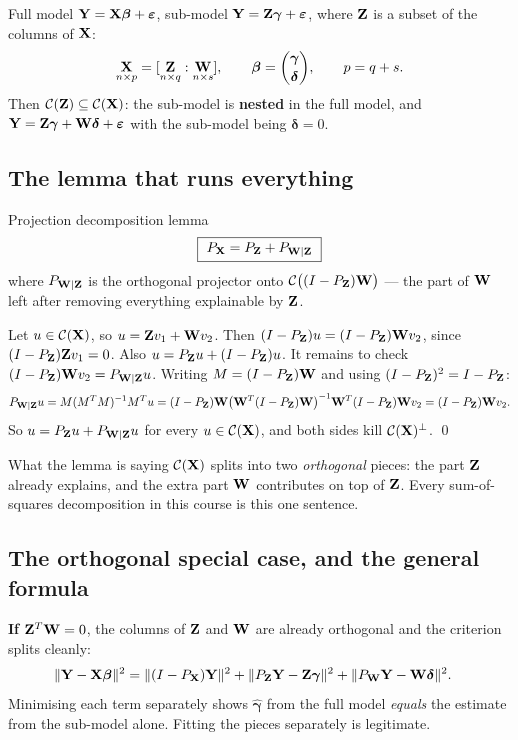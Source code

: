 \documentclass[11pt]{article}
\begin{document}
Full model $\mathbf{Y}=\mathbf{X}\boldsymbol{\beta}+\boldsymbol{\varepsilon}$, sub-model $\mathbf{Y}=\mathbf{Z}\boldsymbol{\gamma}+\boldsymbol{\varepsilon}$, where $\mathbf{Z}$ is a
subset of the columns of $\mathbf{X}$:
\[
  \underset{n\times p}{\mathbf{X}}=[\underset{n\times q}{\mathbf{Z}}:\underset{n\times s}{\mathbf{W}}],\qquad
  \boldsymbol{\beta}=\binom{\boldsymbol{\gamma}}{\boldsymbol{\delta}},\qquad p=q+s .
\]
Then $\mathcal{C}(\mathbf{Z})\subseteq\mathcal{C}(\mathbf{X})$: the sub-model is \textbf{nested} in the full model, and
$\mathbf{Y}=\mathbf{Z}\boldsymbol{\gamma}+\mathbf{W}\boldsymbol{\delta}+\boldsymbol{\varepsilon}$ with the sub-model being
$\boldsymbol{\delta}=0$.

\subsection{The lemma that runs everything}

\begin{idea}{Projection decomposition lemma}
\[
  \boxed{\ P_{\bX}=P_{\bZ}+P_{\bW\mid\bZ}\ }
\]
where $P_{\mathbf{W}\mid\mathbf{Z}}$ is the orthogonal projector onto $\mathcal{C}\big((I-P_{\mathbf{Z}})\mathbf{W}\big)$ ---
the part of $\mathbf{W}$ left after removing everything explainable by $\mathbf{Z}$.
\end{idea}

\prf Let $u\in\mathcal{C}(\mathbf{X})$, so $u=\mathbf{Z} v_1+\mathbf{W} v_2$. Then $(I-P_{\mathbf{Z}})u=(I-P_{\mathbf{Z}})\mathbf{W} v_2$, since
$(I-P_{\mathbf{Z}})\mathbf{Z} v_1=0$. Also $u=P_{\mathbf{Z}} u+(I-P_{\mathbf{Z}})u$. It remains to check
$(I-P_{\mathbf{Z}})\mathbf{W} v_2 = P_{\mathbf{W}\mid\mathbf{Z}}u$. Writing $M=(I-P_{\mathbf{Z}})\mathbf{W}$ and using $(I-P_{\mathbf{Z}})^2=I-P_{\mathbf{Z}}$:
\[
  P_{\mathbf{W}\mid\mathbf{Z}}u = M(M^TM)^{-1}M^T u
   = (I-P_{\mathbf{Z}})\mathbf{W}\big(\mathbf{W}^T(I-P_{\mathbf{Z}})\mathbf{W}\big)^{-1}\mathbf{W}^T(I-P_{\mathbf{Z}})\mathbf{W} v_2
   = (I-P_{\mathbf{Z}})\mathbf{W} v_2 .
\]
So $u=P_{\mathbf{Z}} u+P_{\mathbf{W}\mid\mathbf{Z}}u$ for every $u\in\mathcal{C}(\mathbf{X})$, and both sides kill
$\mathcal{C}(\mathbf{X})^\perp$. \qed

\begin{idea}{What the lemma is saying}
$\mathcal{C}(\mathbf{X})$ splits into two \emph{orthogonal} pieces: the part $\mathbf{Z}$ already explains, and the
extra part $\mathbf{W}$ contributes on top of $\mathbf{Z}$. Every sum-of-squares decomposition in this
course is this one sentence.
\end{idea}

\subsection{The orthogonal special case, and the general formula}

\textbf{If $\mathbf{Z}^T\mathbf{W}=0$}, the columns of $\mathbf{Z}$ and $\mathbf{W}$ are already orthogonal and the
criterion splits cleanly:
\begin{align*}
  \|\mathbf{Y}-\mathbf{X}\boldsymbol{\beta}\|^2 &= \|(I-P_{\mathbf{X}})\mathbf{Y}\|^2+\|P_{\mathbf{Z}}\mathbf{Y}-\mathbf{Z}\boldsymbol{\gamma}\|^2
     +\|P_{\mathbf{W}}\mathbf{Y}-\mathbf{W}\boldsymbol{\delta}\|^2 .
\end{align*}
Minimising each term separately shows $\hat{\boldsymbol\gamma}$ from the full model
\emph{equals} the estimate from the sub-model alone. Fitting the pieces separately is
legitimate.
\end{document}
